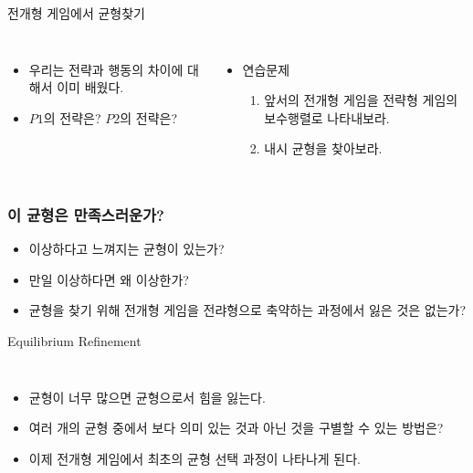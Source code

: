 \documentclass[final]{beamer}
\begin{document}
\begin{frame}[t]{전개형 게임에서 균형찾기}
	\begin{columns}[c]
	\column{15em}
	\begin{itemize}
		\item 우리는 전략과 행동의 차이에 대해서 이미 배웠다. 
		\item $P1$의 전략은? $P2$의 전략은?
	\end{itemize}
	\column{15em}
	\begin{itemize}
		\item 연습문제 
		\begin{enumerate}
			\item 앞서의 전개형 게임을 전략형 게임의 보수행렬로 나타내보라.
			\item 내시 균형을 찾아보라. 
		\end{enumerate}
	\end{itemize}
	\end{columns}
\end{frame}

\begin{frame}\frametitle{이 균형은 만족스러운가?}\vspace{3em}
\begin{itemize}
	\item 이상하다고 느껴지는 균형이 있는가? 
	\item 만일 이상하다면 왜 이상한가? 
	\item 균형을 찾기 위해 전개형 게임을 전랴형으로 축약하는 과정에서 잃은 것은 없는가? 
\end{itemize}
\end{frame}

\begin{frame}[t]{Equilibrium Refinement}
	\begin{columns}[c]
	\column{20em}
	\begin{itemize}
		\item 균형이 너무 많으면 균형으로서 힘을 잃는다. 
		\item 여러 개의 균형 중에서 보다 의미 있는 것과 아닌 것을 구별할 수 있는 방법은?
		\item 이제 전개형 게임에서 최초의 균형 선택 과정이 나타나게 된다. 
	\end{itemize}
	\column{13em}
	\end{columns}
\end{frame}
\end{document}
